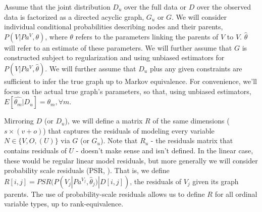 \documentclass[letterpaper]{article}
\begin{document}
\begin{table}[h]
\centering
{}
\smallskip
\caption{Notation}
\label{tab:notation}
\end{table}

Assume that the joint distribution $D_{u}$ over the full data or $D$ over the observed data is factorized as a directed acyclic graph, $G_{u}$ or $G$.  We will consider individual conditional probabilities describing nodes and their parents, $P(V | Pa^{V}, \theta)$, where $\theta$ refers to the parameters linking  the parents of $V$ to $V$.  $\hat{\theta}$ will refer to an estimate of these parameters.  We will further assume that $G$ is constructed subject to regularization and using unbiased estimators for $P(V | Pa^{V}, \hat{\theta})$.  We will further assume that $D_u$ plus any given constraints are sufficient to infer the true graph up to Markov equivalence.  For convenience, we'll focus on the actual true graph's parameters, so that, using unbiased estimators, $E[\hat{\theta_m}|D_u] = \theta_m, \forall m$.

Mirroring $D$ (or $D_u$), we will define a matrix $R$ of the same dimensions ($s \times (v + o)$) that captures the residuals of modeling every variable $N \in \{V, O, (U)\}$ via $G$ (or $G_u$).  Note that $R_u$ - the residuals matrix that contains residuals of $U$ - doesn't make sense and isn't defined.  In the linear case, these would be regular linear model residuals, but more generally we will consider probability scale residuals (PSR, \cite{shepherd_probability-scale_2016}).  That is, we define $R[i, j] = PSR(P(V_j | Pa^{V_j}, \hat{\theta}_j) | D[i, j])$, the residuals of $V_j$ given its graph parents.  The use of probability-scale residuals allows us to define $R$ for all ordinal variable types, up to rank-equivalence.
\end{document}
